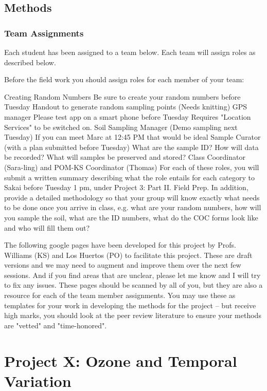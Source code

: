 \documentclass{tufte-book}\usepackage[]{graphicx}\usepackage[]{xcolor}
\begin{document}
\section{Methods}

\subsection{Team Assignments}

Each student has been assigned to a team below. Each team will assign roles as described below.

Before the field work you should assign roles for each member of your team:


Creating Random Numbers
Be sure to create your random numbers before Tuesday
Handout to generate random sampling points (Needs knitting)
GPS manager
Please test app on a smart phone before Tuesday
Requires "Location Services" to be switched on.
Soil Sampling Manager (Demo sampling next Tuesday)
If you can meet Marc at 12:45 PM that would be ideal
Sample Curator (with a plan submitted before Tuesday)
What are the sample ID?
How will data be recorded?
What will samples be preserved and stored?
Class Coordinator (Sara-ling) and POM-KS Coordinator (Thomas)
For each of these roles, you will submit a written summary describing what the role entails for each category to Sakai before Tuesday 1 pm, under Project 3: Part II. Field Prep. In addition, provide a detailed methodology so that your group will know exactly what needs to be done once you arrive in class, e.g. what are your random numbers, how will you sample the soil, what are the ID numbers, what do the COC forms look like and who will fill them out?

The following google pages have been developed for this project by Profs. Williams (KS) and Los Huertos (PO) to facilitate this project. These are draft versions and we may need to augment and improve them over the next few sessions. And if you find areas that are unclear, please let me know and I will try to fix any issues. These pages should be scanned by all of you, but they are also a resource for each of the team member assignments.  You may use these as templates for your work in developing the methods for the project -- but receive high marks, you should look at the peer review literature to ensure your methods are "vetted" and "time-honored".

\chapter{Project X: Ozone and Temporal Variation}
\end{document}
